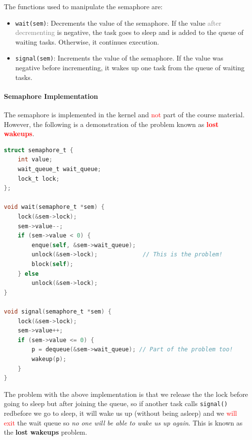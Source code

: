 \documentclass[openany,12pt]{book}
\newcommand{\code}[1]{\texttt{#1}}
\newcommand{\red}[1]{\textcolor{Red}{#1}}
\newcommand{\gray}[1]{\textcolor{gray}{#1}}
\begin{document}
The functions used to manipulate the semaphore are:
\begin{itemize}
    \item \code{wait(sem)}: Decrements the value of the semaphore. If the value \gray{after decrementing} is negative, the task goes to sleep and is added to the queue of waiting tasks. Otherwise, it continues execution.

    \item \code{signal(sem)}: Increments the value of the semaphore. If the value was negative before incrementing, it wakes up one task from the queue of waiting tasks.
\end{itemize}

\paragraph{Semaphore Implementation} The semaphore is implemented in the kernel and \red{not} part of the course material. However, the following is a demonstration of the problem known as \red{\textbf{lost wakeups}}.
\begin{lstlisting}[language=C, caption={Lost Wakeups Problem}, label={lst:lost_wakeups}]
struct semaphore_t {
    int value;                          
    wait_queue_t wait_queue;            
    lock_t lock;                        
};

void wait(semaphore_t *sem) {
    lock(&sem->lock);
    sem->value--; 
    if (sem->value < 0) {
        enque(self, &sem->wait_queue);
        unlock(&sem->lock);             // This is the problem!
        block(self);
    } else 
        unlock(&sem->lock);
}

void signal(semaphore_t *sem) {
    lock(&sem->lock);
    sem->value++;
    if (sem->value <= 0) {
        p = dequeue(&sem->wait_queue); // Part of the problem too!
        wakeup(p);
    }
}
\end{lstlisting}
The problem with the above implementation is that we release the the lock before going to sleep but after joining the queue, so if another task calls \code{signal()} red{before} we go to sleep, it will wake us up (without being asleep) and we \red{will exit} the wait queue so \textit{no one will be able to wake us up again}. This is known as the \textbf{lost wakeups} problem.
\end{document}
